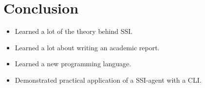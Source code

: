 \chapter{Conclusion}

\begin{itemize}
    \item Learned a lot of the theory behind SSI.
    \item Learned a lot about writing an academic report.
    \item Learned a new programming language.
    \item Demonstrated practical application of a SSI-agent with a CLI.
\end{itemize}